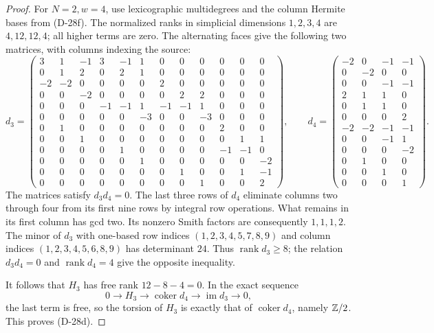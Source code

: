 \begin{proof}
For \(N=2,w=4\), use lexicographic multidegrees and the
column Hermite bases from (D-28f). The normalized ranks
in simplicial dimensions \(1,2,3,4\) are \(4,12,12,4\);
all higher terms are zero. The alternating faces give
the following two matrices, with columns indexing the
source:
\begingroup\small\setlength{\arraycolsep}{2pt}
\[
d_3=\begin{pmatrix}
3&1&-1&3&-1&1&0&0&0&0&0&0\\
0&1&2&0&2&1&0&0&0&0&0&0\\
-2&-2&0&0&0&0&2&0&0&0&0&0\\
0&0&-2&0&0&0&0&2&2&0&0&0\\
0&0&0&-1&-1&1&-1&-1&1&0&0&0\\
0&0&0&0&0&-3&0&0&-3&0&0&0\\
0&1&0&0&0&0&0&0&0&2&0&0\\
0&0&1&0&0&0&0&0&0&0&1&1\\
0&0&0&0&1&0&0&0&0&-1&-1&0\\
0&0&0&0&0&1&0&0&0&0&0&-2\\
0&0&0&0&0&0&0&1&0&0&1&-1\\
0&0&0&0&0&0&0&0&1&0&0&2
\end{pmatrix},\qquad
d_4=\begin{pmatrix}
-2&0&-1&-1\\
0&-2&0&0\\
0&0&-1&-1\\
2&1&1&0\\
0&1&1&0\\
0&0&0&2\\
-2&-2&-1&-1\\
0&0&-1&1\\
0&0&0&-2\\
0&1&0&0\\
0&0&1&0\\
0&0&0&1
\end{pmatrix}.
\]
\endgroup
The matrices satisfy \(d_3d_4=0\). The last three rows
of \(d_4\) eliminate columns two through four from its
first nine rows by integral row operations. What remains
in its first column has gcd two. Its nonzero Smith
factors are consequently \(1,1,1,2\). The minor of
\(d_3\) with one-based row indices
\((1,2,3,4,5,7,8,9)\) and column indices
\((1,2,3,4,5,6,8,9)\) has determinant \(24\).
Thus \(\operatorname{rank}d_3\ge8\); the relation
\(d_3d_4=0\) and \(\operatorname{rank}d_4=4\) give the
opposite inequality.

It follows that \(H_3\) has free rank \(12-8-4=0\).
In the exact sequence
\[
0\longrightarrow H_3\longrightarrow\operatorname{coker}d_4
  \longrightarrow\operatorname{im}d_3\longrightarrow0,
\]
the last term is free, so the torsion of \(H_3\) is
exactly that of \(\operatorname{coker}d_4\), namely
\(\mathbb Z/2\). This proves (D-28d).
\end{proof}

